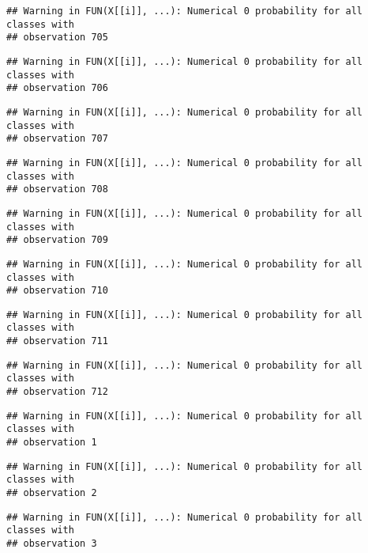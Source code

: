 \documentclass[
]{article}
\begin{document}
\begin{verbatim}
## Warning in FUN(X[[i]], ...): Numerical 0 probability for all classes with
## observation 705
\end{verbatim}

\begin{verbatim}
## Warning in FUN(X[[i]], ...): Numerical 0 probability for all classes with
## observation 706
\end{verbatim}

\begin{verbatim}
## Warning in FUN(X[[i]], ...): Numerical 0 probability for all classes with
## observation 707
\end{verbatim}

\begin{verbatim}
## Warning in FUN(X[[i]], ...): Numerical 0 probability for all classes with
## observation 708
\end{verbatim}

\begin{verbatim}
## Warning in FUN(X[[i]], ...): Numerical 0 probability for all classes with
## observation 709
\end{verbatim}

\begin{verbatim}
## Warning in FUN(X[[i]], ...): Numerical 0 probability for all classes with
## observation 710
\end{verbatim}

\begin{verbatim}
## Warning in FUN(X[[i]], ...): Numerical 0 probability for all classes with
## observation 711
\end{verbatim}

\begin{verbatim}
## Warning in FUN(X[[i]], ...): Numerical 0 probability for all classes with
## observation 712
\end{verbatim}

\begin{verbatim}
## Warning in FUN(X[[i]], ...): Numerical 0 probability for all classes with
## observation 1
\end{verbatim}

\begin{verbatim}
## Warning in FUN(X[[i]], ...): Numerical 0 probability for all classes with
## observation 2
\end{verbatim}

\begin{verbatim}
## Warning in FUN(X[[i]], ...): Numerical 0 probability for all classes with
## observation 3
\end{verbatim}
\end{document}
